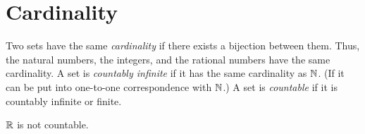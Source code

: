 
\section{Cardinality}

Two sets have the same \textit{cardinality} if there exists a bijection between them. Thus, the natural numbers, the integers, and the rational numbers have the same cardinality. A set is \textit{countably infinite} if it has the same cardinality as \(\mathbb{N}\). (If it can be put into one-to-one correspondence with \(\mathbb{N}\).) A set is \textit{countable} if it is countably infinite or finite. \\

\setcounter{BoxCounter}{5}
\begin{theorem}
    \(\mathbb{R}\) is not countable.
\end{theorem}

